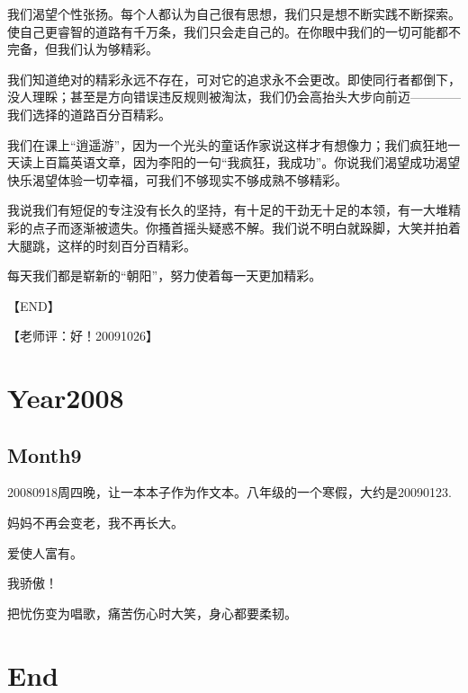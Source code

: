 \documentclass[UTF8]{Diaries}
\begin{document}
我们渴望个性张扬。每个人都认为自己很有思想，我们只是想不断实践不断探索。使自己更睿智的道路有千万条，我们只会走自己的。在你眼中我们的一切可能都不完备，但我们认为够精彩。

我们知道绝对的精彩永远不存在，可对它的追求永不会更改。即使同行者都倒下，没人理睬；甚至是方向错误违反规则被淘汰，我们仍会高抬头大步向前迈————我们选择的道路百分百精彩。

我们在课上“逍遥游”，因为一个光头的童话作家说这样才有想像力；我们疯狂地一天读上百篇英语文章，因为李阳的一句“我疯狂，我成功”。你说我们渴望成功渴望快乐渴望体验一切幸福，可我们不够现实不够成熟不够精彩。

我说我们有短促的专注没有长久的坚持，有十足的干劲无十足的本领，有一大堆精彩的点子而逐渐被遗失。你搔首摇头疑惑不解。我们说不明白就跺脚，大笑并拍着大腿跳，这样的时刻百分百精彩。

每天我们都是崭新的“朝阳”，努力使着每一天更加精彩。

【END】

【老师评：好！20091026】



\chapter{Year2008}



\section{Month9}
20080918周四晚，让一本本子作为作文本。八年级的一个寒假，大约是20090123.

妈妈不再会变老，我不再长大。

爱使人富有。

我骄傲！

把忧伤变为唱歌，痛苦伤心时大笑，身心都要柔韧。



\chapter{End}
\end{document}
